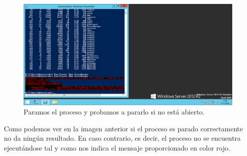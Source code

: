 \begin{flushleft}
\begin{figure}[H]
	\centering
	\includegraphics[scale=0.4]{pwshell2.png}
	\caption{Paramos el proceso y probamos a pararlo si no está abierto.}
\end{figure}

Como podemos ver en la imagen anterior si el proceso es parado correctamente no da ningún resultado. En caso contrario, es decir, el proceso no se encuentra ejecutándose tal y como nos indica el mensaje proporcionado en color rojo.
\end{flushleft}

